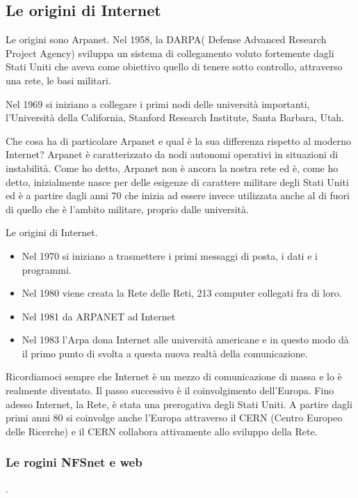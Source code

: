  \subsection{Le origini di Internet}
 Le origini sono Arpanet. Nel 1958, la DARPA( Defense Advanced Research Project Agency) sviluppa un sistema di collegamento voluto fortemente dagli Stati Uniti che aveva come obiettivo quello di tenere sotto controllo, attraverso una rete, le basi militari. \par
 Nel 1969 si iniziano a collegare i primi nodi delle università importanti, l'Università della California, Stanford Research Institute, Santa Barbara, Utah. \par
 Che cosa ha di particolare Arpanet e qual è la sua differenza rispetto al moderno Internet? Arpanet è caratterizzato da nodi autonomi operativi in situazioni di instabilità. Come ho detto, Arpanet non è ancora la nostra rete ed è, come ho detto, inizialmente nasce per delle esigenze di carattere militare degli Stati Uniti ed è a partire dagli anni 70 che inizia ad essere invece utilizzata anche al di fuori di quello che è l'ambito militare, proprio dalle università. \par
 Le origini di Internet. \par 
 \begin{itemize}
     \item Nel 1970 si iniziano a trasmettere i primi messaggi di posta, i dati e i programmi. 
     \item Nel 1980 viene creata la Rete delle Reti, 213 computer collegati fra di loro.
     \item Nel 1981 da ARPANET ad Internet
     \item Nel 1983 l'Arpa dona Internet alle università americane e in questo modo dà il primo punto di svolta a questa nuova realtà della comunicazione. 
 \end{itemize}
 
  Ricordiamoci sempre che Internet è un mezzo di comunicazione di massa e lo è realmente diventato. Il passo successivo è il coinvolgimento dell'Europa. Fino adesso Internet, la Rete, è stata una prerogativa degli Stati Uniti. A partire dagli primi anni 80 si coinvolge anche l'Europa attraverso il CERN (Centro Europeo delle Ricerche) e il CERN collabora attivamente allo sviluppo della Rete. 
  \subsubsection{Le rogini NFSnet e web}. 

